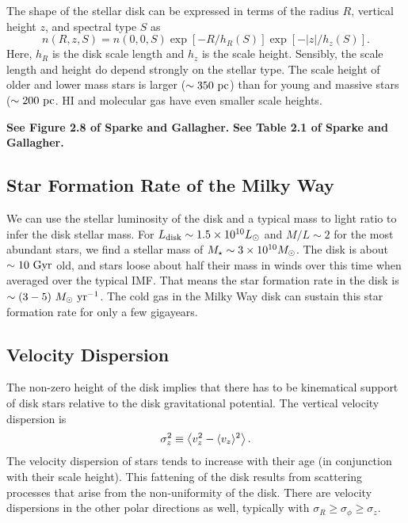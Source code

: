 \documentclass[]{article}
\begin{document}
The shape of the stellar disk can be expressed
in terms of the radius $R$, vertical height
$z$, and spectral type $S$ as
\begin{equation}
n(R,z,S) = n(0,0,S) \exp\left[-R/h_{R}(S)\right]\exp\left[-|z|/h_{z}(S)\right].
\end{equation}
\noindent
Here, $h_R$ is the disk scale length and $h_z$ is the scale height.
Sensibly, the scale length and height do depend strongly on the stellar
type.  The scale height of older and lower mass stars is larger 
($\sim350~\mathrm{pc}$) than for 
young and massive stars ($\sim200~\mathrm{pc}$. HI and molecular gas have even 
smaller scale heights.

{\bf See Figure 2.8 of Sparke and Gallagher.}
{\bf See Table 2.1 of Sparke and Gallagher.}

\subsection{Star Formation Rate of the Milky Way}

We can use the stellar luminosity of the disk and
a typical mass to light ratio to infer the disk stellar
mass. For $L_{\mathrm{disk}}\sim 1.5\times10^{10}L_{\odot}$
and $M/L\sim2$ for the most abundant stars, we find
a stellar mass of $M_{\star}\sim3 \times 10^{10}M_{\odot}$.
The disk is about $\sim10~\mathrm{Gyr}$ old, and stars loose
about half their mass in winds over this time when
averaged over the typical IMF. That means the star
formation rate in the disk is $\sim(3-5)~M_{\odot}~\mathrm{yr}^{-1}$.
The cold gas in the Milky Way disk can sustain this
star formation rate for only a few gigayears.

\subsection{Velocity Dispersion}

The non-zero height of the disk implies that there
has to be kinematical support of disk stars relative to
the disk gravitational potential. The vertical velocity
dispersion is
\begin{equation}
\sigma_z^2 \equiv \left\langle v_z^2 - \langle v_z\rangle^2\right\rangle.
\end{equation}
The velocity dispersion of stars tends to increase with their
age (in conjunction with their scale height). This fattening
of the disk results from scattering processes that arise from
the non-uniformity of the disk. There are velocity dispersions
in the other polar directions as well, typically with
$\sigma_R \ge \sigma_\phi \ge \sigma_z$.
\end{document}
